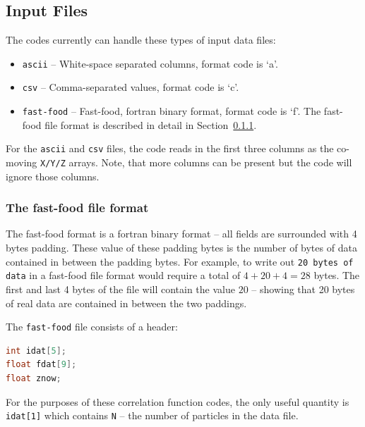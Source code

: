 \documentclass[12pt,titlepage]{article}
\begin{document}
\subsection{Input Files}
The codes currently can handle these types of input data files:
\begin{itemize}
\item \texttt{ascii} -- White-space separated columns, format code is `a'.
\item \texttt{csv}   -- Comma-separated values, format code is `c'.
\item \texttt{fast-food} -- Fast-food, fortran binary format, format code is `f'.
The fast-food file format is described in detail in Section~\ref{section:fastfood}.
\end{itemize}
For the \texttt{ascii} and \texttt{csv} files, the code reads in the first three columns as the co-moving \texttt{X/Y/Z} arrays. Note, that more columns 
can be present but the code will ignore those columns. 

\subsubsection{The fast-food file format}\label{section:fastfood}
The fast-food format is a fortran binary format -- all fields are surrounded with 4 bytes padding. These value of these padding bytes 
is the number of bytes of data contained in between the padding bytes. For example, to write out \texttt{20 bytes of data} in 
a fast-food file format would require a total of $4+20+4=28$ bytes. The first and last 4 bytes of the file will contain the value $20$ -- 
showing that 20 bytes of real data are contained in between the two paddings. 

\flushleft The \texttt{fast-food} file consists of a header:
\begin{lstlisting}[language=C,numbers=none]
int idat[5];
float fdat[9];
float znow;
\end{lstlisting}
For the purposes of these correlation function codes, the only useful quantity is \texttt{idat[1]} which contains \texttt{N} -- the number of particles 
in the data file. 
\end{document}
